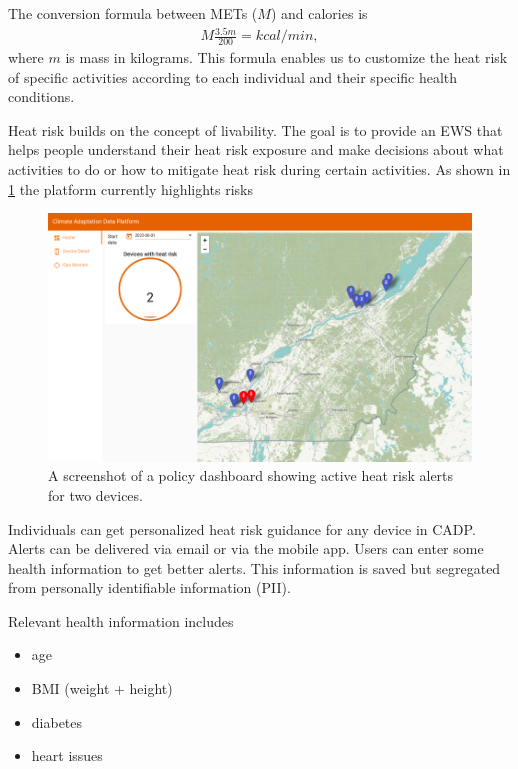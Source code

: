 \documentclass[
]{book}
\providecommand{\tightlist}{%
  \setlength{\itemsep}{0pt}\setlength{\parskip}{0pt}}
\begin{document}
The conversion formula between METs (\(M\)) and calories is
\begin{align}
M \frac{3.5 m}{200} = kcal/min,
\end{align}
where \(m\) is mass in kilograms.
This formula enables us to customize the heat risk of specific activities
according to each individual and their specific health conditions.

Heat risk builds on the concept of livability.
The goal is to provide an EWS that helps people understand their heat risk
exposure and make decisions about what activities to do or
how to mitigate heat risk during certain activities.
As shown in \ref{fig:cadp-ews-quebec} the platform currently highlights
risks

\begin{figure}

{\centering \includegraphics[width=12.79in]{images/cadp_ews_quebec} 

}

\caption{A screenshot of a policy dashboard showing active heat risk alerts for two devices.}\label{fig:cadp-ews-quebec}
\end{figure}

Individuals can get personalized heat risk guidance for any device in CADP.
Alerts can be delivered via email or via the mobile app.
Users can enter some health information to get better alerts.
This information is saved but
segregated from personally identifiable information (PII).

Relevant health information includes

\begin{itemize}
\tightlist
\item
  age
\item
  BMI (weight + height)
\item
  diabetes
\item
  heart issues
\end{itemize}
\end{document}
